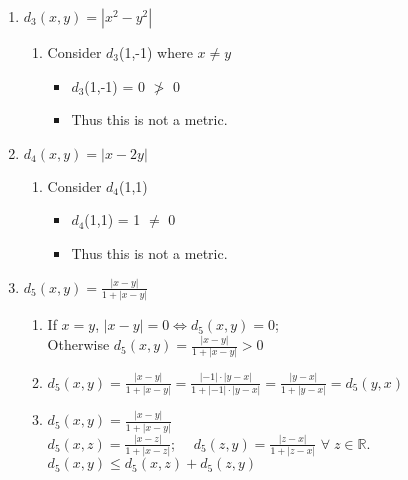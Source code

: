 \documentclass[12pt]{article}
\begin{document}
\begin{enumerate}[label=(\roman*)]
    \item $d_3(x,y) = |x^2 - y^2|$
        \begin{enumerate}[label=(\alph*)]
            \item Consider $d_3$(1,-1) where $x \neq y$
             \begin{itemize}
                 \item $d_3$(1,-1) = 0 $\ngtr$ 0
                 \item Thus this is not a metric.\\
             \end{itemize}
        \end{enumerate}
    \newpage
    \item $d_4(x,y) = |x - 2y|$
        \begin{enumerate}[label=(\alph*)]
                \item Consider $d_4$(1,1) 
                 \begin{itemize}
                     \item $d_4$(1,1) = 1 $\neq$ 0
                     \item Thus this is not a metric.\\
                 \end{itemize}
            \end{enumerate}

    \item $d_5(x,y) = \frac{|x-y|}{1 + |x-y|}$
        \begin{enumerate}[label=(\alph*)]
            \item If $x = y$, $|x - y| = 0 \Leftrightarrow d_5(x,y) = 0$;\\
                  Otherwise $d_5(x,y) = \frac{|x-y|}{1 + |x-y|} > 0$
            \item $d_5(x,y) = \frac{|x-y|}{1 + |x-y|} = \frac{|-1|\cdot |y-x|}{1 + |-1|\cdot |y-x|} = \frac{|y-x|}{1 + |y-x|} = d_5(y,x)$
            \item $d_5(x,y) = \frac{|x-y|}{1 + |x-y|}$ \\
                  $d_5(x,z) = \frac{|x-z|}{1 + |x-z|}$; $\quad d_5(z,y) = \frac{|z-x|}{1 + |z-x|}$ \;\;$\forall\; z\in \mathbb{R}$.\\
                  \Rightarrow\;\;
                  $d_5(x,y) \le d_5(x,z) + d_5(z,y)$\\
        \end{enumerate}
\end{enumerate}
\end{document}
